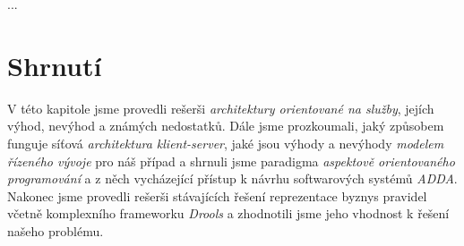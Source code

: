 
...

\section{Shrnutí}

V této kapitole jsme provedli rešerši \textit{architektury orientované
na služby}, jejích výhod, nevýhod a známých nedostatků. Dále jsme
prozkoumali, jaký způsobem funguje síťová \textit{architektura klient-server},
jaké jsou výhody a nevýhody \textit{modelem řízeného vývoje} pro náš případ
a shrnuli jsme paradigma \textit{aspektově orientovaného programování} a
z něch vycházející přístup k návrhu softwarových systémů \textit{ADDA}.
Nakonec jsme provedli rešerši stávajících řešení reprezentace byznys pravidel
včetně komplexního frameworku \textit{Drools} a zhodnotili jsme jeho vhodnost
k řešení našeho problému.
